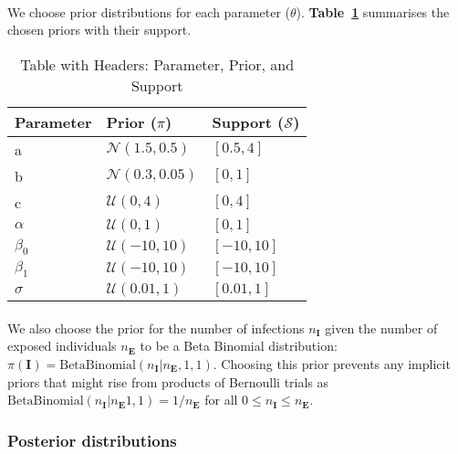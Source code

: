 \paragraph{}We choose prior distributions for each parameter \pi($\theta$). \textbf{Table~\ref{tab:priorsA}} summarises the chosen priors with their support. 

\begin{table}[ht]
    \centering
    \begin{tabular}{|l|l|l|}
        \hline
        \textbf{Parameter} & \textbf{Prior ($\pi$)} & \textbf{Support ($\mathcal{S}$)} \\
        \hline
        a & $\mathcal{N}(1.5, 0.5)$ & $[0.5, 4]$ \\
        \hline
        b & $\mathcal{N}(0.3, 0.05)$ & $[0, 1]$ \\
        \hline
        c & $\mathcal{U}(0, 4)$ & $[0, 4]$ \\
        \hline
        $\alpha$ & $\mathcal{U}(0, 1)$ & $[0, 1]$ \\
        \hline
        $\beta_0$ & $\mathcal{U}(-10, 10)$ & $[-10, 10]$ \\
        \hline
        $\beta_1$ & $\mathcal{U}(-10, 10)$ & $[-10, 10]$ \\
        \hline
        $\sigma$ &  $\mathcal{U}(0.01, 1)$ & $[0.01, 1]$ \\
        \hline
    \end{tabular}
    \caption{Table with Headers: Parameter, Prior, and Support}
    \label{tab:priorsA}
\end{table}

\paragraph{}We also choose the prior for the number of infections $n_\mathbf{I}$ given the number of exposed individuals $n_\mathbf{E}$ to be a Beta Binomial distribution: $\pi(\mathbf{I}) = \text{BetaBinomial}(n_\mathbf{I} | n_\mathbf{E}, 1, 1)$. Choosing this prior prevents any implicit priors that might rise from products of Bernoulli trials\cite{Hay2020-pr} as $\text{BetaBinomial}(n_\mathbf{I} | n_\mathbf{E} 1, 1) = 1 / n_\mathbf{E}$ for all $0 \leq n_\mathbf{I} \leq n_\mathbf{E}$. 


\subsubsection{Posterior distributions}

